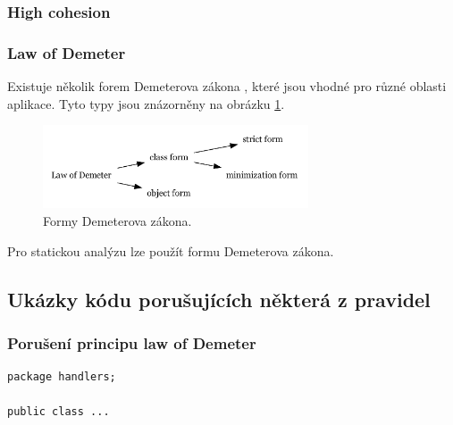 


\subsubsection{High cohesion}

\subsubsection{Law of Demeter}

Existuje několik forem Demeterova zákona \cite{35588}, které jsou vhodné pro různé oblasti aplikace. Tyto typy jsou znázorněny na obrázku \ref{demeter_law_types}.

\begin{figure}[h!]
  \centering
  \includegraphics[width=0.7\textwidth]{./graphs/demeter_law_types.png}
  \caption{Formy Demeterova zákona.\label{demeter_law_types}}
\end{figure}

Pro statickou analýzu lze použít  formu Demeterova zákona.

\subsection{Ukázky kódu porušujících některá z pravidel}

\subsubsection{Porušení principu law of Demeter}

\begin{verbatim}
package handlers;

public class ...

\end{verbatim}

